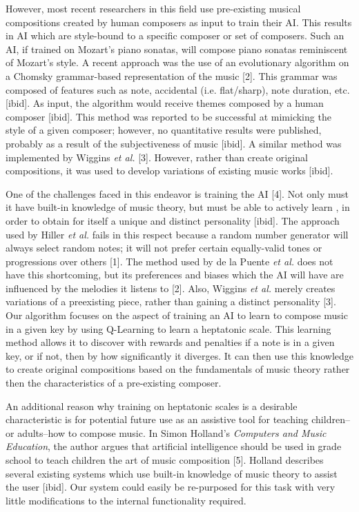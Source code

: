 \documentclass{chi2009}
\begin{document}
However, most recent researchers in this field use pre-existing musical compositions created by human composers as input to train their AI.  This results in AI which are style-bound to a specific composer or set of composers.  Such an AI, if trained on Mozart's piano sonatas, will compose piano sonatas reminiscent of Mozart's style.  A recent approach was the use of an evolutionary algorithm on a Chomsky grammar-based representation of the music [2]. This grammar was composed of features such as
note, accidental (i.e. flat/sharp), note duration, etc. [ibid]. As input, the algorithm would receive themes composed by a human composer [ibid]. This method was reported to be successful at mimicking the style of a given composer; however, no quantitative results were published, probably as a result of the subjectiveness of music [ibid].  A similar method was implemented by Wiggins \textit{et al.} [3]. However, rather than create original compositions, it was used to develop variations of existing music works [ibid].

One of the challenges faced in this endeavor is training the AI [4]. Not only must it have built-in knowledge of music theory, but must be able to actively learn , in order to obtain for itself a unique and distinct personality [ibid]. The approach used by Hiller \textit{et al.} fails in this respect because a random number generator will always select random notes; it will not prefer certain equally-valid tones or progressions over others [1]. The method used by de la Puente \textit{et al.} does not have this shortcoming, but its preferences and biases which the AI will have are influenced by the melodies it listens to [2]. Also, Wiggins \textit{et al.} merely creates variations of a preexisting piece, rather than gaining a distinct personality [3]. Our algorithm focuses on the aspect of training an AI to learn to compose music in a given key by using Q-Learning to learn a heptatonic scale.  This learning method allows it to discover with rewards and penalties if a note is in a given key, or if not, then by how significantly it diverges.  It can then use this knowledge to create original compositions based on the fundamentals of music theory rather then the characteristics of a pre-existing composer.

An additional reason why training on heptatonic scales is a desirable characteristic is for potential future use as an assistive tool for teaching children--or adults--how to compose music. In Simon Holland's \textit{Computers and Music Education}, the author argues that artificial intelligence should be used in grade school to teach children the art of music composition [5].  Holland describes several existing systems which use built-in knowledge of music theory to assist the user [ibid].  Our system could easily be re-purposed for this task with very little modifications to the internal functionality required.
\end{document}
